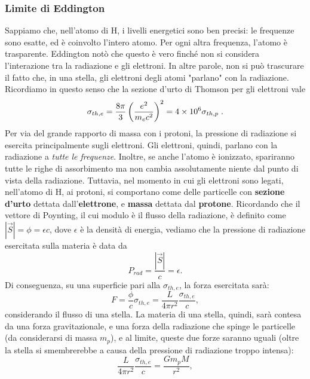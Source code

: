 \subsubsection{Limite di Eddington}
Sappiamo che, nell'atomo di H, i livelli energetici sono ben precisi: le frequenze sono esatte, ed è coinvolto l'intero atomo. 
Per ogni altra frequenza, l'atomo è trasparente.
Eddington notò che questo è vero finché non si considera l'interazione tra la radiazione e gli elettroni. 
In altre parole, non si può trascurare il fatto che, in una stella, gli elettroni degli atomi "parlano" con la radiazione.
Ricordiamo in questo senso che la sezione d'urto di Thomson per gli elettroni vale
\begin{equation}
    \sigma_{th,e} = \frac{8\pi}{3}\left(\frac{e^2}{m_ec^2}\right)^2=4\times10^{6}\sigma_{th,p}\hspace{1mm}.
    \label{eq: sezione d'urto Thomson}
\end{equation}
Per via del grande rapporto di massa con i protoni, la pressione di radiazione si esercita principalmente sugli elettroni.
Gli elettroni, quindi, parlano con la radiazione a \textit{tutte le frequenze}.
Inoltre, se anche l'atomo è ionizzato, spariranno tutte le righe di assorbimento ma non cambia assolutamente niente dal punto di vista della radiazione.
Tuttavia, nel momento in cui gli elettroni sono legati, nell'atomo di H, ai protoni, si comportano come delle particelle con \textbf{sezione d'urto} dettata dall'\textbf{elettrone}, e \textbf{massa} dettata dal \textbf{protone}.
Ricordando che il vettore di Poynting, il  cui modulo è il flusso della radiazione, è definito come $|\vec{S}|= \phi = \epsilon c $, dove $\epsilon$ è la densità di energia, vediamo che la pressione di radiazione esercitata sulla materia è data da
\begin{equation}
    P_{rad} = \frac{|\vec{S}|}{c}=\epsilon.
\end{equation}
Di conseguenza, su una superficie pari alla $\sigma_{th,e}$, la forza esercitata sarà:
\begin{equation}
    F=\frac{\phi}{c}\sigma_{th,e}=\frac{L}{4\pi r^2}\frac{\sigma_{th,e}}{c},
\end{equation}
considerando il flusso di una stella.
La materia di una stella, quindi, sarà contesa da una forza gravitazionale, e una forza della radiazione che spinge le particelle (da considerarsi di massa $m_p$), e al limite, queste due forze saranno uguali (oltre la stella si smembrerebbe a causa della pressione di radiazione troppo intensa):
\begin{equation}
    \frac{L}{4\pi r^2}\frac{\sigma_{th,e}}{c} = \frac{Gm_pM}{r^2},
\end{equation}
